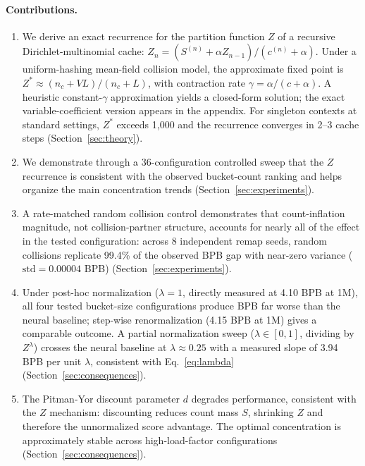 \documentclass[11pt]{article}
\begin{document}
\paragraph{Contributions.}
\begin{enumerate}
\item We derive an exact recurrence for the partition function $Z$ of a recursive Dirichlet-multinomial cache: $Z_n = (S^{(n)} + \alpha Z_{n-1})/(c^{(n)} + \alpha)$. Under a uniform-hashing mean-field collision model, the approximate fixed point is $Z^* \approx (n_c + VL)/(n_c + L)$, with contraction rate $\gamma = \alpha/(c + \alpha)$. A heuristic constant-$\gamma$ approximation yields a closed-form solution; the exact variable-coefficient version appears in the appendix. For singleton contexts at standard settings, $Z^*$ exceeds 1,000 and the recurrence converges in 2--3 cache steps (Section~\ref{sec:theory}).

\item We demonstrate through a 36-configuration controlled sweep that the $Z$ recurrence is consistent with the observed bucket-count ranking and helps organize the main concentration trends (Section~\ref{sec:experiments}).

\item A rate-matched random collision control demonstrates that count-inflation magnitude, not collision-partner structure, accounts for nearly all of the effect in the tested configuration: across 8 independent remap seeds, random collisions replicate 99.4\% of the observed BPB gap with near-zero variance ($\text{std} = 0.00004$ BPB) (Section~\ref{sec:experiments}).

\item Under post-hoc normalization ($\lambda = 1$, directly measured at 4.10 BPB at 1M), all four tested bucket-size configurations produce BPB far worse than the neural baseline; step-wise renormalization (4.15 BPB at 1M) gives a comparable outcome. A partial normalization sweep ($\lambda \in [0,1]$, dividing by $Z^\lambda$) crosses the neural baseline at $\lambda \approx 0.25$ with a measured slope of 3.94 BPB per unit $\lambda$, consistent with Eq.~\ref{eq:lambda} (Section~\ref{sec:consequences}).

\item The Pitman-Yor discount parameter $d$ degrades performance, consistent with the $Z$ mechanism: discounting reduces count mass $S$, shrinking $Z$ and therefore the unnormalized score advantage. The optimal concentration is approximately stable across high-load-factor configurations (Section~\ref{sec:consequences}).
\end{enumerate}
\end{document}
